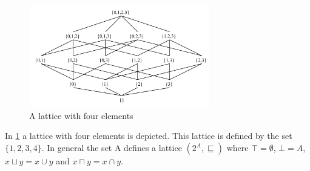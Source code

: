 \begin{figure}
\begin{center}
\includegraphics[width=0.7\textwidth]{figures/lattice_example_numbers}
\end{center}
\caption{A lattice with four elements}
\label{lattice_example}
\end{figure}

In \cref{lattice_example} a lattice with four elements is depicted.
This lattice is defined by the set $\{1, 2, 3, 4 \}$.
In general the set A defines a lattice $(2^A, \sqsubseteq )$ where $\top = \emptyset$, $\bot = A$, $x\sqcup y = x \cup y$ and $x \sqcap y = x \cap y$.

